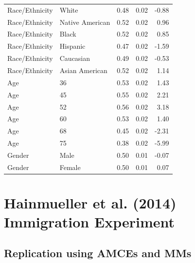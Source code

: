 \documentclass[a4paper,12pt]{article}\usepackage[]{graphicx}\usepackage[]{color}
\begin{document}
\begin{table}[ht]
\begin{tabular}{lp{3in}rrr}
  Race/Ethnicity & White & 0.48 & 0.02 & -0.88 \\ 
  Race/Ethnicity & Native American & 0.52 & 0.02 & 0.96 \\ 
  Race/Ethnicity & Black & 0.52 & 0.02 & 0.85 \\ 
  Race/Ethnicity & Hispanic & 0.47 & 0.02 & -1.59 \\ 
  Race/Ethnicity & Caucasian & 0.49 & 0.02 & -0.53 \\ 
  Race/Ethnicity & Asian American & 0.52 & 0.02 & 1.14 \\ 
  Age & 36 & 0.53 & 0.02 & 1.43 \\ 
  Age & 45 & 0.55 & 0.02 & 2.21 \\ 
  Age & 52 & 0.56 & 0.02 & 3.18 \\ 
  Age & 60 & 0.53 & 0.02 & 1.40 \\ 
  Age & 68 & 0.45 & 0.02 & -2.31 \\ 
  Age & 75 & 0.38 & 0.02 & -5.99 \\ 
  Gender & Male & 0.50 & 0.01 & -0.07 \\ 
  Gender & Female & 0.50 & 0.01 & 0.07 \\ 
   \hline
\end{tabular}
\endgroup
\end{table}


\clearpage

\section{Hainmueller et al. (2014) Immigration Experiment}\label{app:hainmuellerimmigration}

\subsection{Replication using AMCEs and MMs}
\end{document}
